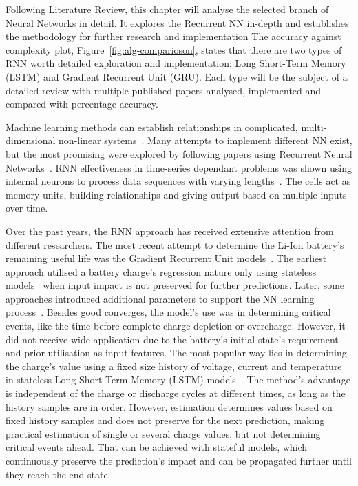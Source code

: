 %
Following Literature Review, this chapter will analyse the selected branch of Neural Networks in detail.
It explores the Recurrent NN in-depth and establishes the methodology for further research and implementation
The accuracy against complexity plot, Figure~\ref{fig:alg-comparioson}, states that there are two types of RNN worth detailed exploration and implementation: Long Short-Term Memory (LSTM) and Gradient Recurrent Unit (GRU).
Each type will be the subject of a detailed review with multiple published papers analysed, implemented and compared with percentage accuracy. 

%
%
Machine learning methods can establish relationships in complicated, multi-dimensional non-linear systems~\cite{hansen_support_2005,anton_battery_2013,he_state_2014}.
Many attempts to implement different NN exist, but the most promising were explored by following papers using Recurrent Neural Networks~\cite{song_lithium-ion_2018,Chemali2017,mamo_long_2020,jiao_gru-rnn_2020,xiao_accurate_2019,javid_adaptive_2020,zhang_deep_2020}.
RNN effectiveness in time-series dependant problems was shown using internal neurons to process data sequences with varying lengths~\cite{Chemali2017}.
The cells act as memory units, building relationships and giving output based on multiple inputs over time.

%
%
Over the past years, the RNN approach has received extensive attention from different researchers. The most recent attempt to determine the Li-Ion battery's remaining useful life was the Gradient Recurrent Unit models~\cite{song_lithium-ion_2018,javid_adaptive_2020,xiao_accurate_2019,jiao_gru-rnn_2020}.
The earliest approach utilised a battery charge's regression nature only using stateless models~\cite{song_lithium-ion_2018,jiao_gru-rnn_2020,xiao_accurate_2019} when input impact is not preserved for further predictions.
Later, some approaches introduced additional parameters to support the NN learning process~\cite{mamo_long_2020,jiao_gru-rnn_2020,javid_adaptive_2020}.
Besides good converges, the model's use was in determining critical events, like the time before complete charge depletion or overcharge.
However, it did not receive wide application due to the battery's initial state's requirement and prior utilisation as input features.
The most popular way lies in determining the charge's value using a fixed size history of voltage, current and temperature in stateless Long Short-Term Memory (LSTM) models~\cite{Chemali2017,mamo_long_2020,javid_adaptive_2020,zhang_deep_2020}.
The method's advantage is independent of the charge or discharge cycles at different times, as long as the history samples are in order.
However, estimation determines values based on fixed history samples and does not preserve for the next prediction, making practical estimation of single or several charge values, but not determining critical events ahead.
That can be achieved with stateful models, which continuously preserve the prediction's impact and can be propagated further until they reach the end state.

